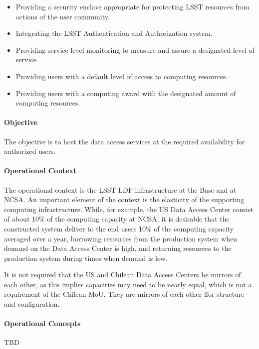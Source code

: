 \begin{itemize}
\item Providing a security enclave appropriate for protecting LSST resources from actions of the user community.

\item Integrating the LSST Authentication and Authorization system.

\item Providing service-level monitoring to measure and assure a designated level of service.

\item Providing users with a default level of access to computing resources.

\item Providing users with a computing award with the designated amount of computing resources.

\end{itemize}

\paragraph{Objective}

The objective is to host the data access services at the required availability for authorized users.

\paragraph{Operational Context}

The operational context is the LSST LDF infrastructure at the Base and at NCSA. An important element of the context is the elasticity of the supporting computing infrastructure. While, for example, the US Data Access Center consist of about 10\% of the computing capacity at NCSA, it is desirable that the constructed system deliver to the end users 10\% of the computing capacity averaged over a year, borrowing resources from the production system when demand on the Data Access Center is high, and returning resources to the production system during times when demand is low.

It is not required that the US and Chilean Data Access Centers be mirrors of each other, as this implies capacities may need to be nearly equal, which is not a requirement of the Chilean MoU. They are mirrors of each other ffor structure and configuration.  

\paragraph{Operational Concepts}
TBD
